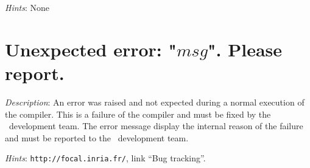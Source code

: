 {\em Hints}: None



\section*{Unexpected error: "$msg$". Please report.}

{\em Description}: An error was raised and not expected during a
normal execution of the compiler. This is a failure of the compiler
and must be fixed by the \focal\ development team. The error message
display the internal reason of the failure and must be reported to the
\focal\ development team.

{\em Hints}: \verb+http://focal.inria.fr/+, link ``Bug tracking''.
